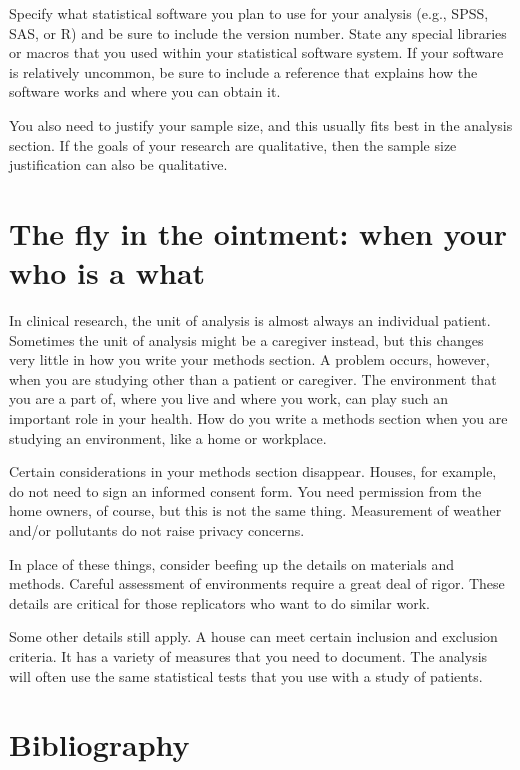 \documentclass[
  letterpaper,
  DIV=11,
  numbers=noendperiod]{scrreprt}
\begin{document}
\begin{tcolorbox}
Specify what statistical software you plan to use for your analysis
(e.g., SPSS, SAS, or R) and be sure to include the version number. State
any special libraries or macros that you used within your statistical
software system. If your software is relatively uncommon, be sure to
include a reference that explains how the software works and where you
can obtain it.

You also need to justify your sample size, and this usually fits best in
the analysis section. If the goals of your research are qualitative,
then the sample size justification can also be qualitative.

\section{The fly in the ointment: when your who is a
what}\label{the-fly-in-the-ointment-when-your-who-is-a-what}

In clinical research, the unit of analysis is almost always an
individual patient. Sometimes the unit of analysis might be a caregiver
instead, but this changes very little in how you write your methods
section. A problem occurs, however, when you are studying other than a
patient or caregiver. The environment that you are a part of, where you
live and where you work, can play such an important role in your health.
How do you write a methods section when you are studying an environment,
like a home or workplace.

Certain considerations in your methods section disappear. Houses, for
example, do not need to sign an informed consent form. You need
permission from the home owners, of course, but this is not the same
thing. Measurement of weather and/or pollutants do not raise privacy
concerns.

In place of these things, consider beefing up the details on materials
and methods. Careful assessment of environments require a great deal of
rigor. These details are critical for those replicators who want to do
similar work.

Some other details still apply. A house can meet certain inclusion and
exclusion criteria. It has a variety of measures that you need to
document. The analysis will often use the same statistical tests that
you use with a study of patients.

\section{Bibliography}\label{bibliography-18}


\end{tcolorbox}
\end{document}
